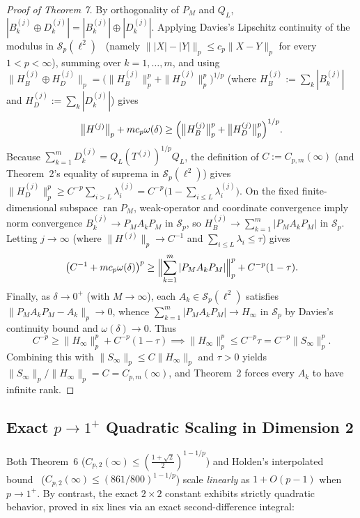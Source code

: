 \documentclass[10pt,letterpaper]{article}
\newcommand{\Sp}{\mathcal{S}_p}
\newcommand{\ran}{\operatorname{ran}}
\begin{document}
\begin{proof}[Proof of Theorem 7]
By orthogonality of $P_M$ and $Q_L$, $|B_k^{(j)} \oplus D_k^{(j)}| = |B_k^{(j)}| \oplus |D_k^{(j)}|$. Applying Davies's Lipschitz continuity of the modulus in $\Sp(\ell^2)$~\cite{Davies1988} (namely $\||X| - |Y|\|_p \le c_p \|X - Y\|_p$ for every $1 < p < \infty$), summing over $k = 1,\dots,m$, and using $\|H_B^{(j)} \oplus H_D^{(j)}\|_p = \bigl(\|H_B^{(j)}\|_p^p + \|H_D^{(j)}\|_p^p\bigr)^{1/p}$ (where $H_B^{(j)} := \sum_k |B_k^{(j)}|$ and $H_D^{(j)} := \sum_k |D_k^{(j)}|$) gives
\[
  \bigl\|H^{(j)}\bigr\|_p + m c_p \omega(\delta) \ge \Bigl(\bigl\|H_B^{(j)}\bigr\|_p^p + \bigl\|H_D^{(j)}\bigr\|_p^p\Bigr)^{1/p}.
\]
Because $\sum_{k=1}^m D_k^{(j)} = Q_L (T^{(j)})^{1/p} Q_L$, the definition of $C := C_{p,m}(\infty)$ (and Theorem~2's equality of suprema in $\Sp(\ell^2)$) gives $\|H_D^{(j)}\|_p^p \ge C^{-p}\sum_{i > L} \lambda_i^{(j)} = C^{-p}\bigl(1 - \sum_{i \le L} \lambda_i^{(j)}\bigr)$. On the fixed finite-dimensional subspace $\ran P_M$, weak-operator and coordinate convergence imply norm convergence $B_k^{(j)} \to P_M A_k P_M$ in $\Sp$, so $H_B^{(j)} \to \sum_{k=1}^m |P_M A_k P_M|$ in $\Sp$. Letting $j \to \infty$ (where $\|H^{(j)}\|_p \to C^{-1}$ and $\sum_{i \le L} \lambda_i \le \tau$) gives
\[
  \bigl(C^{-1} + m c_p \omega(\delta)\bigr)^p \ge \Bigl\|\sum_{k=1}^m |P_M A_k P_M|\Bigr\|_p^p + C^{-p}(1 - \tau).
\]
Finally, as $\delta \to 0^+$ (with $M \to \infty$), each $A_k \in \Sp(\ell^2)$ satisfies $\|P_M A_k P_M - A_k\|_p \to 0$, whence $\sum_{k=1}^m |P_M A_k P_M| \to H_\infty$ in $\Sp$ by Davies's continuity bound and $\omega(\delta) \to 0$. Thus
\[
  C^{-p} \ge \|H_\infty\|_p^p + C^{-p}(1 - \tau) \implies \|H_\infty\|_p^p \le C^{-p}\tau = C^{-p}\|S_\infty\|_p^p.
\]
Combining this with $\|S_\infty\|_p \le C \|H_\infty\|_p$ and $\tau > 0$ yields $\|S_\infty\|_p / \|H_\infty\|_p = C = C_{p,m}(\infty)$, and Theorem~2 forces every $A_k$ to have infinite rank.
\end{proof}

\subsection{Exact \texorpdfstring{$p \to 1^+$}{p -> 1+} Quadratic Scaling in Dimension 2}

Both Theorem~6 ($C_{p,2}(\infty) \le (\frac{1+\sqrt{2}}{2})^{1-1/p}$) and Holden's interpolated bound~\cite[(4)]{Holden2026b} ($C_{p,2}(\infty) \le (861/800)^{1-1/p}$) scale \emph{linearly} as $1 + O(p-1)$ when $p \to 1^+$. By contrast, the exact $2\times 2$ constant exhibits strictly quadratic behavior, proved in six lines via an exact second-difference integral:
\end{document}
